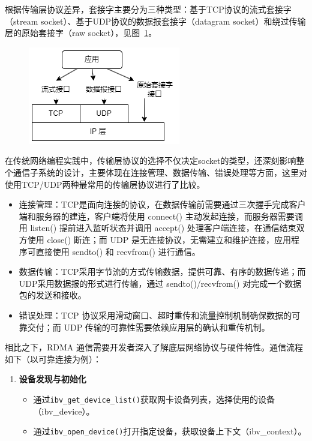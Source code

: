 {根据传输层协议差异，套接字主要分为三种类型：基于TCP协议的流式套接字（stream socket）、基于UDP协议的数据报套接字（datagram socket）和绕过传输层的原始套接字（raw socket），见图~\ref{fig:Socket-Type}。
\begin{figure}[!htbp]
    \centering
    \includegraphics[width=0.35\linewidth]{Img/Socket-Type.png}
    \label{fig:Socket-Type}
\end{figure}
在传统网络编程实践中，传输层协议的选择不仅决定socket的类型，还深刻影响整个通信子系统的设计，主要体现在连接管理、数据传输、错误处理等方面，这里对使用TCP/UDP两种最常用的传输层协议进行了比较。

\begin{itemize}
    \item 连接管理：TCP是面向连接的协议，在数据传输前需要通过三次握手完成客户端和服务器的建连，客户端将使用 connect() 主动发起连接，而服务器需要调用 listen() 提前进入监听状态并调用 accept() 处理客户端连接，在通信结束双方使用 close() 断连；而 UDP 是无连接协议，无需建立和维护连接，应用程序可直接使用 sendto() 和 recvfrom() 进行通信。
    \item 数据传输：TCP采用字节流的方式传输数据，提供可靠、有序的数据传递；而 UDP采用数据报的形式进行传输，通过 sendto()/recvfrom() 对完成一个数据包的发送和接收。
    \item 错误处理：TCP 协议采用滑动窗口、超时重传和流量控制机制确保数据的可靠交付；而 UDP 传输的可靠性需要依赖应用层的确认和重传机制。
\end{itemize}

相比之下，RDMA 通信需要开发者深入了解底层网络协议与硬件特性。通信流程如下（以可靠连接为例）：
\begin{enumerate}[label=\textbf{步骤 \arabic*.}, leftmargin=0.5cm, align=left]
    \item \textbf{设备发现与初始化}
    \begin{itemize}
        \item 通过\texttt{ibv\_get\_device\_list()}获取网卡设备列表，选择使用的设备（ibv\_device）。
        \item 通过\texttt{ibv\_open\_device()}打开指定设备，获取设备上下文（ibv\_context）。
    \end{itemize}
    

\end{enumerate}}
